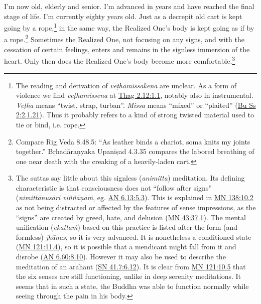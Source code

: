 \documentclass[12pt,openany]{book}%
\begin{document}
I’m now old, elderly and senior. I’m advanced in years and have reached the final stage of life. I’m currently eighty years old. Just as a decrepit old cart is kept going by a rope,\footnote{The reading and derivation of \textit{\textsanskrit{veṭhamissakena}} are unclear. As a form of violence we find \textit{\textsanskrit{veṭhamissena}} at \href{https://suttacentral.net/thag2.12/en/sujato\#1.1}{Thag 2.12:1.1}, notably also in instrumental. \textit{\textsanskrit{Veṭha}} means “twist, strap, turban”. \textit{Missa} means “mixed” or “plaited” (\href{https://suttacentral.net/pli-tv-bu-vb-ss2/en/sujato\#2.1.21}{Bu Ss 2:2.1.21}). Thus it probably refers to a kind of strong twisted material used to tie or bind, i.e. rope. } in the same way, the Realized One’s body is kept going as if by a rope.\footnote{Compare Rig Veda 8.48.5: “As leather binds a chariot, soma knits my joints together.” \textsanskrit{Bṛhadāraṇyaka} \textsanskrit{Upaniṣad} 4.3.35 compares the labored breathing of one near death with the creaking of a heavily-laden cart. } Sometimes the Realized One, not focusing on any signs, and with the cessation of certain feelings, enters and remains in the signless immersion of the heart. Only then does the Realized One’s body become more comfortable.\footnote{The suttas say little about this signless (\textit{animitta}) meditation. Its defining characteristic is that consciousness does not “follow after signs” (\textit{\textsanskrit{nimittānusāri} \textsanskrit{viññāṇaṁ}}, eg. \href{https://suttacentral.net/an6.13/en/sujato\#5.3}{AN 6.13:5.3}). This is explained in \href{https://suttacentral.net/mn138/en/sujato\#10.2}{MN 138:10.2} as not being distracted or affected by the features of sense impressions, as the “signs” are created by greed, hate, and delusion (\href{https://suttacentral.net/mn43/en/sujato\#37.1}{MN 43:37.1}). The mental unification (\textit{\textsanskrit{ekattaṁ}})  based on this practice is listed after the form (and formless) \textit{\textsanskrit{jhānas}}, so it is very advanced. It is nonetheless a conditioned state (\href{https://suttacentral.net/mn121/en/sujato\#11.4}{MN 121:11.4}), so it is possible that a mendicant might fall from it and disrobe (\href{https://suttacentral.net/an6.60/en/sujato\#8.10}{AN 6.60:8.10}). However it may also be used to describe the meditation of an arahant (\href{https://suttacentral.net/sn41.7/en/sujato\#6.12}{SN 41.7:6.12}). It is clear from \href{https://suttacentral.net/mn121/en/sujato\#10.5}{MN 121:10.5} that the six senses are still functioning, unlike in deep serenity meditations. It seems that in such a state, the Buddha was able to function normally while seeing through the pain in his body. } 
\end{document}

